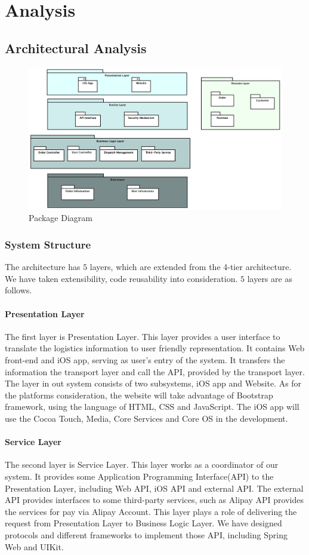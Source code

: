 \documentclass[12pt]{scrreprt}
\begin{document}
\chapter{Analysis}
\section{Architectural Analysis}
\begin{figure}[H]
  \centering\includegraphics[width=6in]{DocumentRes/PackageDiagram.png}
  \caption{Package Diagram}
\end{figure}
\subsection{System Structure}
The architecture has $5$ layers, which are extended from the 4-tier architecture. We have taken extensibility, code reusability into consideration. $5$ layers are as follows.
\subsubsection{Presentation Layer}
The first layer is Presentation Layer. This layer provides a user interface to translate the logistics information to user friendly representation. It contains Web front-end and iOS app, serving as user's entry of the system. It transfers the information the transport layer and call the API, provided by the transport layer. The layer in out system consists of two subsystems, iOS app and Website. As for the platforms consideration, the website will take advantage of Bootstrap framework, using the language of HTML, CSS and JavaScript. The iOS app will use the Cocoa Touch, Media, Core Services and Core OS in the development.
\subsubsection{Service Layer}
The second layer is Service Layer. This layer works as a coordinator of our system. It provides some Application Programming Interface(API) to the Presentation Layer, including Web API, iOS API and external API. The external API provides interfaces to some third-party services, such as Alipay API provides the services for pay via Alipay Account. This layer plays a role of delivering the request from Presentation Layer to Business Logic Layer. We have designed protocols and different frameworks to implement those API, including Spring Web and UIKit.
\end{document}
